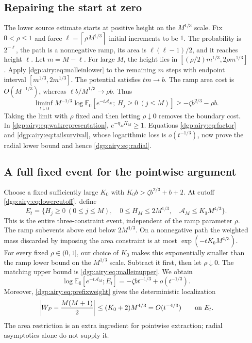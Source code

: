 \documentclass[11pt,letterpaper]{article}
\numberwithin{equation}{section}
\theoremstyle{remark}\newtheorem{remark}[theorem]{Remark}
\newcommand{\EE}{\mathbb E}
\newcommand{\ceil}[1]{\left\lceil #1\right\rceil}
\newcommand{\area}{\mathcal A}
\begin{document}
\subsection{Repairing the start at zero}
The lower source estimate starts at positive height on the $M^{1/3}$
scale. Fix $0<\rho\leq1$ and force
$\ell=\ceil{\rho M^{1/3}}$ initial increments to be $1$.
The probability is $2^{-\ell}$, the path is a nonnegative ramp, its
area is $\ell(\ell-1)/2$, and it reaches height $\ell$.
Let $m=M-\ell$. For large $M$, the height lies in
$[(\rho/2)m^{1/3},2\rho m^{1/3}]$.
Apply \eqref{dgp:airy:eq:malleinlower} to the remaining $m$ steps with endpoint
interval $[m^{1/3},2m^{1/3}]$. The potential satisfies $tm\to b$.
The ramp area cost is $O(M^{-1/3})$, whereas
$\ell b/M^{1/3}\to\rho b$. Thus
\begin{equation}\label{dgp:airy:eq:zerostart}
 \liminf_{t\downarrow0}M^{-1/3}
 \log\EE_0[e^{-t\area_M};\ H_j\geq0\ (j\leq M)]
 \geq-\zeta b^{2/3}-\rho b.
\end{equation}
Taking the limit with $\rho$ fixed and then letting $\rho\downarrow0$
removes the boundary cost. In \eqref{dgp:airy:eq:walkrepresentation},
$e^{-\eta_MH_M}\geq1$. Equations \eqref{dgp:airy:eq:factor} and
\eqref{dgp:airy:eq:tailsurvival}, whose logarithmic loss is
$o(t^{-1/3})$, now prove the radial lower bound and hence
\eqref{dgp:airy:eq:radial}.

\subsection{A full fixed event for the pointwise argument}
Choose a fixed sufficiently large $K_0$ with
$K_0b>\zeta b^{2/3}+b+2$. At cutoff \eqref{dgp:airy:eq:lowercutoff}, define
\begin{equation}\label{dgp:airy:eq:fixedprefixevent}
 E_t=\{H_j\geq0\ (0\leq j\leq M),\quad
          0\leq H_M\leq2M^{1/3},\quad
          \area_M\leq K_0M^{4/3}\}.
\end{equation}
This is the entire three-constraint event, independent of the ramp
parameter $\rho$. The ramp subevents above end below $2M^{1/3}$.
On a nonnegative path the weighted mass discarded by imposing the
area constraint is at most
$\exp(-tK_0M^{4/3})$.
For every fixed $\rho\in(0,1]$, our choice of $K_0$ makes this
exponentially smaller than the ramp lower bound on the $M^{1/3}$
scale. Subtract it first, then let $\rho\downarrow0$.
The matching upper bound is \eqref{dgp:airy:eq:malleinupper}. We obtain
\begin{equation}\label{dgp:airy:eq:prefixmass}
 \log\EE_0[e^{-t\area_M};E_t]
          =-\zeta b t^{-1/3}+o(t^{-1/3}).
\end{equation}
Moreover, \eqref{dgp:airy:eq:prefixweight} gives the deterministic localization
\begin{equation}\label{dgp:airy:eq:prefixwindow}
 \left|W_P-\frac{M(M+1)}2\right|
 \leq(K_0+2)M^{4/3}=O(t^{-4/3})\qquad\hbox{on }E_t.
\end{equation}
The area restriction is an extra ingredient for pointwise extraction;
radial asymptotics alone do not supply it.
\end{document}
